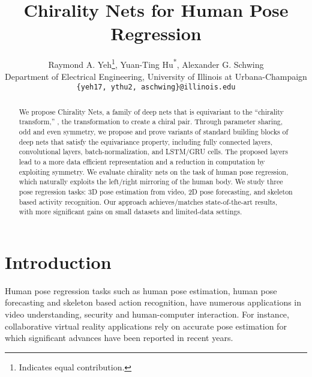 \documentclass{article}
\begin{document}
\title{Chirality Nets for Human Pose Regression}

\author{
Raymond A. Yeh\thanks{Indicates equal contribution.}, \;\;
Yuan-Ting Hu\textsuperscript{*}, \;\;
Alexander G. Schwing\\
Department of Electrical Engineering, University of Illinois at Urbana-Champaign\\
\texttt{\{yeh17, ythu2, aschwing\}@illinois.edu}
}

\maketitle

\begin{abstract}
We propose Chirality Nets, a family of deep nets that is equivariant to the ``chirality transform,'' \ie, the transformation to create a chiral pair. Through parameter sharing, odd and even symmetry, we propose and prove variants of standard building blocks of deep nets that satisfy the equivariance property, including fully connected layers, convolutional layers, batch-normalization, and LSTM/GRU cells. The proposed layers lead to a more data efficient representation and a reduction in computation by exploiting symmetry. We evaluate  chirality nets on the task of human pose regression, which naturally exploits the left/right mirroring of the human body. We study  three pose regression tasks: 3D pose estimation from video, 2D pose forecasting, and skeleton based activity recognition. Our approach achieves/matches state-of-the-art results, with more significant gains on small datasets and limited-data settings. 
\end{abstract} 


\section{Introduction}
\label{sec:intro}
Human pose regression tasks such as human pose estimation, human pose forecasting and skeleton based action recognition, have numerous applications in video understanding, security and human-computer interaction. For instance, collaborative virtual reality applications rely on accurate pose estimation for which significant advances have been reported in recent years.
\end{document}
